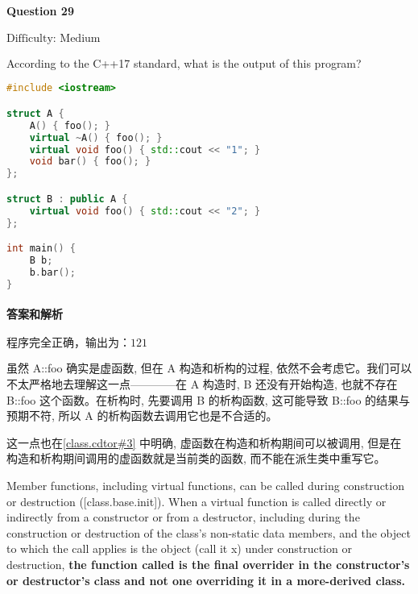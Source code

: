\documentclass{article}
\begin{document}
	
	\paragraph*{Question 29} $\boxed{\text{Difficulty: Medium}} $			
	
	According to the C++17 standard, what is the output of this program?
	
	\begin{lstlisting}[language=C++]  		
#include <iostream>

struct A {
	A() { foo(); }
	virtual ~A() { foo(); }
	virtual void foo() { std::cout << "1"; }
	void bar() { foo(); }
};

struct B : public A {
	virtual void foo() { std::cout << "2"; }
};

int main() {
	B b;
	b.bar();
}
	\end{lstlisting}
	
	
	\paragraph*{答案和解析} $\boxed{\text{程序完全正确，输出为：121}} $
	
	虽然 A::foo 确实是虚函数, 但在 A 构造和析构的过程, 依然不会考虑它。我们可以不太严格地去理解这一点————在 A 构造时, B 还没有开始构造, 也就不存在 B::foo 这个函数。在析构时, 先要调用 B 的析构函数, 这可能导致 B::foo 的结果与预期不符, 所以 A 的析构函数去调用它也是不合适的。
	
	这一点也在\href{https://timsong-cpp.github.io/cppwp/n4659/class.cdtor#3}{[class.cdtor\#3]} 中明确, 虚函数在构造和析构期间可以被调用, 但是在构造和析构期间调用的虚函数就是当前类的函数, 而不能在派生类中重写它。
	
	\begin{lightgrayleftbar}
		Member functions, including virtual functions, can be called during construction or destruction ([class.base.init]). When a virtual function is called directly or indirectly from a constructor or from a destructor, including during the construction or destruction of the class's non-static data members, and the object to which the call applies is the object (call it x) under construction or destruction, \textbf{ the function called is the final overrider in the constructor's or destructor's class and not one overriding it in a more-derived class.} 
	\end{lightgrayleftbar}
	
\end{document}
